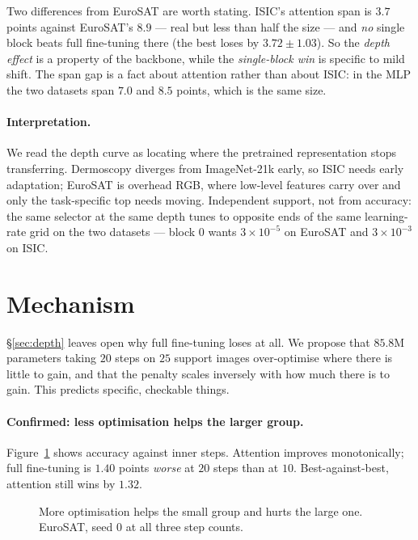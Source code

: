 \documentclass[11pt]{article}
\newcommand{\dd}[2]{$#1 \pm #2$}
\begin{document}
Two differences from EuroSAT are worth stating. ISIC's attention span is $3.7$ points
against EuroSAT's $8.9$ --- real but less than half the size --- and \emph{no} single
block beats full fine-tuning there (the best loses by \dd{3.72}{1.03}). So the
\emph{depth effect} is a property of the backbone, while the \emph{single-block win} is
specific to mild shift. The span gap is a fact about attention rather than about ISIC:
in the MLP the two datasets span $7.0$ and $8.5$ points, which is the same size.

\paragraph{Interpretation.} We read the depth curve as locating where the pretrained
representation stops transferring. Dermoscopy diverges from ImageNet-21k early, so ISIC
needs early adaptation; EuroSAT is overhead RGB, where low-level features carry over and
only the task-specific top needs moving. Independent support, not from accuracy: the
same selector at the same depth tunes to opposite ends of the same learning-rate grid on
the two datasets --- block 0 wants $3\times10^{-5}$ on EuroSAT and $3\times10^{-3}$ on
ISIC.

\section{Mechanism}
\label{sec:mech}

\S\ref{sec:depth} leaves open why full fine-tuning loses at all. We propose that
$85.8$M parameters taking $20$ steps on $25$ support images over-optimise where there is
little to gain, and that the penalty scales inversely with how much there is to gain.
This predicts specific, checkable things.

\paragraph{Confirmed: less optimisation helps the larger group.}
Figure~\ref{fig:steps} shows accuracy against inner steps. Attention improves
monotonically; full fine-tuning is $1.40$ points \emph{worse} at $20$ steps than at
$10$. Best-against-best, attention still wins by $1.32$.

\begin{figure}[t]
\centering
{}
\caption{More optimisation helps the small group and hurts the large one. EuroSAT,
seed $0$ at all three step counts.}
\label{fig:steps}
\end{figure}
\end{document}
